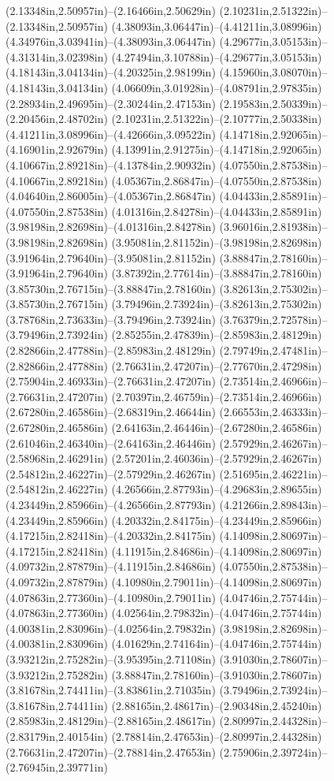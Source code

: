 (2.13348in,2.50957in)--(2.16466in,2.50629in) (2.10231in,2.51322in)--(2.13348in,2.50957in) (4.38093in,3.06447in)--(4.41211in,3.08996in) (4.34976in,3.03941in)--(4.38093in,3.06447in) (4.29677in,3.05153in)--(4.31314in,3.02398in) (4.27494in,3.10788in)--(4.29677in,3.05153in) (4.18143in,3.04134in)--(4.20325in,2.98199in) (4.15960in,3.08070in)--(4.18143in,3.04134in) (4.06609in,3.01928in)--(4.08791in,2.97835in) (2.28934in,2.49695in)--(2.30244in,2.47153in) (2.19583in,2.50339in)--(2.20456in,2.48702in) (2.10231in,2.51322in)--(2.10777in,2.50338in) (4.41211in,3.08996in)--(4.42666in,3.09522in) (4.14718in,2.92065in)--(4.16901in,2.92679in) (4.13991in,2.91275in)--(4.14718in,2.92065in) (4.10667in,2.89218in)--(4.13784in,2.90932in) (4.07550in,2.87538in)--(4.10667in,2.89218in) (4.05367in,2.86847in)--(4.07550in,2.87538in) (4.04640in,2.86005in)--(4.05367in,2.86847in) (4.04433in,2.85891in)--(4.07550in,2.87538in) (4.01316in,2.84278in)--(4.04433in,2.85891in) (3.98198in,2.82698in)--(4.01316in,2.84278in) (3.96016in,2.81938in)--(3.98198in,2.82698in) (3.95081in,2.81152in)--(3.98198in,2.82698in) (3.91964in,2.79640in)--(3.95081in,2.81152in) (3.88847in,2.78160in)--(3.91964in,2.79640in) (3.87392in,2.77614in)--(3.88847in,2.78160in) (3.85730in,2.76715in)--(3.88847in,2.78160in) (3.82613in,2.75302in)--(3.85730in,2.76715in) (3.79496in,2.73924in)--(3.82613in,2.75302in) (3.78768in,2.73633in)--(3.79496in,2.73924in) (3.76379in,2.72578in)--(3.79496in,2.73924in) (2.85255in,2.47839in)--(2.85983in,2.48129in) (2.82866in,2.47788in)--(2.85983in,2.48129in) (2.79749in,2.47481in)--(2.82866in,2.47788in) (2.76631in,2.47207in)--(2.77670in,2.47298in) (2.75904in,2.46933in)--(2.76631in,2.47207in) (2.73514in,2.46966in)--(2.76631in,2.47207in) (2.70397in,2.46759in)--(2.73514in,2.46966in) (2.67280in,2.46586in)--(2.68319in,2.46644in) (2.66553in,2.46333in)--(2.67280in,2.46586in) (2.64163in,2.46446in)--(2.67280in,2.46586in) (2.61046in,2.46340in)--(2.64163in,2.46446in) (2.57929in,2.46267in)--(2.58968in,2.46291in) (2.57201in,2.46036in)--(2.57929in,2.46267in) (2.54812in,2.46227in)--(2.57929in,2.46267in) (2.51695in,2.46221in)--(2.54812in,2.46227in) (4.26566in,2.87793in)--(4.29683in,2.89655in) (4.23449in,2.85966in)--(4.26566in,2.87793in) (4.21266in,2.89843in)--(4.23449in,2.85966in) (4.20332in,2.84175in)--(4.23449in,2.85966in) (4.17215in,2.82418in)--(4.20332in,2.84175in) (4.14098in,2.80697in)--(4.17215in,2.82418in) (4.11915in,2.84686in)--(4.14098in,2.80697in) (4.09732in,2.87879in)--(4.11915in,2.84686in) (4.07550in,2.87538in)--(4.09732in,2.87879in) (4.10980in,2.79011in)--(4.14098in,2.80697in) (4.07863in,2.77360in)--(4.10980in,2.79011in) (4.04746in,2.75744in)--(4.07863in,2.77360in) (4.02564in,2.79832in)--(4.04746in,2.75744in) (4.00381in,2.83096in)--(4.02564in,2.79832in) (3.98198in,2.82698in)--(4.00381in,2.83096in) (4.01629in,2.74164in)--(4.04746in,2.75744in) (3.93212in,2.75282in)--(3.95395in,2.71108in) (3.91030in,2.78607in)--(3.93212in,2.75282in) (3.88847in,2.78160in)--(3.91030in,2.78607in) (3.81678in,2.74411in)--(3.83861in,2.71035in) (3.79496in,2.73924in)--(3.81678in,2.74411in) (2.88165in,2.48617in)--(2.90348in,2.45240in) (2.85983in,2.48129in)--(2.88165in,2.48617in) (2.80997in,2.44328in)--(2.83179in,2.40154in) (2.78814in,2.47653in)--(2.80997in,2.44328in) (2.76631in,2.47207in)--(2.78814in,2.47653in) (2.75906in,2.39724in)--(2.76945in,2.39771in) 